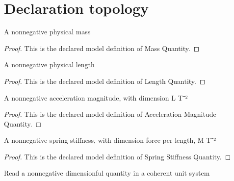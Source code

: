 \section{Declaration topology}
\begin{definition}
  \label{def:physics:phyx-mini-0283:phyxminiproblems-problemphyxmini0283-massquantity}
  A nonnegative physical mass
\end{definition}
\begin{proof}
  This is the declared model definition of Mass Quantity.
\end{proof}
\begin{definition}
  \label{def:physics:phyx-mini-0283:phyxminiproblems-problemphyxmini0283-lengthquantity}
  A nonnegative physical length
\end{definition}
\begin{proof}
  This is the declared model definition of Length Quantity.
\end{proof}
\begin{definition}
  \label{def:physics:phyx-mini-0283:phyxminiproblems-problemphyxmini0283-accelerationmagnitudequantity}
  A nonnegative acceleration magnitude, with dimension L T⁻²
\end{definition}
\begin{proof}
  This is the declared model definition of Acceleration Magnitude Quantity.
\end{proof}
\begin{definition}
  \label{def:physics:phyx-mini-0283:phyxminiproblems-problemphyxmini0283-springstiffnessquantity}
  A nonnegative spring stiffness, with dimension force per length, M T⁻²
\end{definition}
\begin{proof}
  This is the declared model definition of Spring Stiffness Quantity.
\end{proof}
\begin{definition}
  \label{def:physics:phyx-mini-0283:phyxminiproblems-problemphyxmini0283-quantityreadout}
  Read a nonnegative dimensionful quantity in a coherent unit system
\end{definition}
